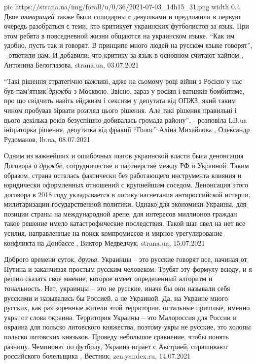 \ifcmt
  pic https://strana.ua/img/forall/u/0/36/2021-07-03_14h15_31.png
	width 0.4
\fi
Двое \emph{товарищей} также были солидарны с девушками и предложили в первую очередь
разобраться с теми, кто критикует украинских футболистов за язык.  При этом
ребята в повседневной жизни общаются на украинском языке.  \enquote{Как им удобно,
пусть так и говорят. В принципе много людей на русском языке говорят}, -
ответили нам. И добавили, что критику за язык в основном считают хайпом
, 
Антонина Белоглазова, strana.ua, 03.07.2021

\enquote{Такі рішення стратегічно важливі, адже на сьомому році війни з Росією у нас
був пам'ятник \emph{дружби} з Москвою. Звісно, зараз у росіян і ватників бомбитиме,
про що свідчить навіть ейджизм і сексизм у депутата від ОПЖЗ, який таким чином
пробував зірвати розгляд цього рішення. Але такі рішення правильні і цього
декілька років безуспішно добивалась громада району}, - розповіла LB.ua
ініціаторка рішення, депутатка від фракції \enquote{Голос} Аліна Михайлова
, 
Олександр Рудоманов, lb.ua, 08.07.2021

Одним из важнейших и ошибочных шагов украинской власти была денонсация Договора
о \emph{дружбе}, сотрудничестве и партнерстве между РФ и Украиной. Таким
образом, страна осталась фактически без работающего инструмента влияния и
юридически оформленных отношений с крупнейшим соседом.  Денонсация этого
договора в 2018 году укладывается в логику нагнетания антироссийской истерии,
милитаризации государственной политики. Однако для экономики Украины, для
позиции страны на международной арене, для интересов миллионов граждан такое
решение имело катастрофические последствия. Такой шаг свел на нет все усилия,
направленные на поиск компромиссов и мирное урегулирование конфликта на
Донбассе
, 
Виктор Медведчук, strana.ua, 15.07.2021

Доброго времени суток, \emph{друзья}. Украинцы – это русские говорят все,
начиная от Путина и заканчивая простым русским человеком. Трубят эту формулу
всюду, и я решил сказать свое мнение, которое имеет определенный алгоритм и
тональность.  Нет, украинцы – это не русские, иначе бы они называли себя
русскими и назывались бы Россией, а не Украиной. Да, на Украине много русских,
как раз коренные жители этой территории, остальные пришлые, именно укры от
слова окраина. Территория Украины – это Малороссия для России и окраина для
польско литовского княжества, поэтому укры не русские, это холопы польско
литовских князьков.  Проведу небольшое сравнение, чтобы понять разницу.
Чемпионат по футболу, Украина играет с Австрией, спрашивают российского
болельщика
, Вестник, zen.yandex.ru, 14.07.2021
